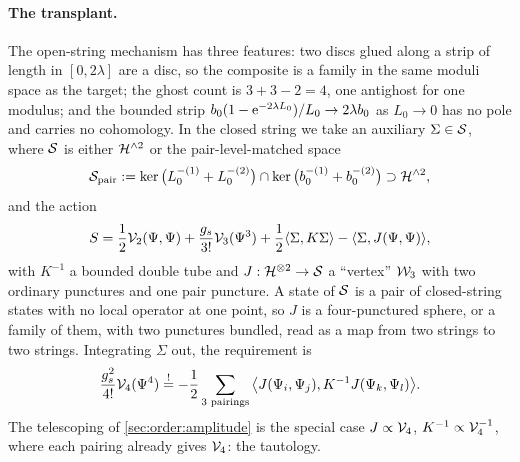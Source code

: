 \paragraph{The transplant.}
The open-string mechanism has three features: two discs glued along a strip of length in $[0, 2 \lambda]$ are a disc, so the composite is a family in the same moduli space as the target; the ghost count is $3 + 3 - 2 = 4$, one antighost for one modulus; and the bounded strip $b_0 (1 - \mathrm{e}^{- 2 \lambda L_0}) / L_0 \to 2 \lambda b_0$ as $L_0 \to 0$ has no pole and carries no cohomology.
In the closed string we take an auxiliary $\Sigma \in {\mathcal{S}}$, where ${\mathcal{S}}$ is either $\mathcal{H}^{\wedge 2}$ or the pair-level-matched space
\begin{equation}
  \label{eq:ch9:pair-space}
  {\mathcal{S}}_{\rm pair}
    := \ker \big( L_0^{-(1)} + L_0^{-(2)} \big) \cap \ker \big( b_0^{-(1)} + b_0^{-(2)} \big)
    \supset \mathcal{H}^{\wedge 2},
\end{equation}
and the action
\begin{equation}
  \label{eq:ch9:changed-action}
  S
    = \frac{1}{2} \mathcal{V}_{2}(\Psi, \Psi) + \frac{g_s}{3!} \mathcal{V}_{3}(\Psi^3) + \frac{1}{2} \langle \Sigma, K \Sigma \rangle - \langle \Sigma, J(\Psi, \Psi) \rangle,
\end{equation}
with $K^{-1}$ a bounded double tube and $J : \mathcal{H}^{\otimes 2} \to {\mathcal{S}}$ a \enquote{vertex} ${\mathcal{W}}_3$ with two ordinary punctures and one pair puncture.
A state of ${\mathcal{S}}$ is a pair of closed-string states with no local operator at one point, so $J$ is a four-punctured sphere, or a family of them, with two punctures bundled, read as a map from two strings to two strings.
Integrating $\Sigma$ out, the requirement is
\begin{equation}
  \label{eq:ch9:factorization}
  \frac{g_s^2}{4!} \mathcal{V}_{4}(\Psi^4)
    \overset{!}{=} - \frac{1}{2} \sum_{\text{3 pairings}} \big\langle J(\Psi_i, \Psi_j), K^{-1} J(\Psi_k, \Psi_l) \big\rangle.
\end{equation}
The telescoping of \cref{sec:order:amplitude} is the special case $J \propto \mathcal{V}_{4}$, $K^{-1} \propto \mathcal{V}_{4}^{-1}$, where each pairing already gives $\mathcal{V}_{4}$: the tautology.

